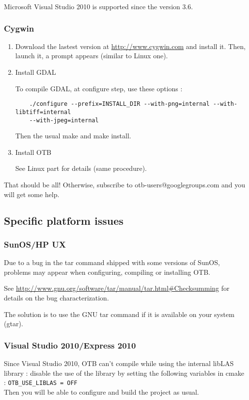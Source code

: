 Microsoft Visual Studio 2010 is supported since the version 3.6. 

\subsubsection{Cygwin}
\begin{enumerate}

\item Download the lastest version at \url{http://www.cygwin.com} and install it.
	Then, launch it, a prompt appears (similar to Linux one).

\item Install GDAL

	To compile GDAL, at configure step, use these options :
\begin{verbatim}
	./configure --prefix=INSTALL_DIR --with-png=internal --with-libtiff=internal
	--with-jpeg=internal
\end{verbatim}
	Then the usual make and make install.


\item Install OTB

	See Linux part for details (same procedure).
\end{enumerate}

That should be all! Otherwise, subscribe to
   otb-users@googlegroups.com and you will get some help.

\subsection{Specific platform issues}
\subsubsection{SunOS/HP UX}
Due to a bug in the tar command shipped with some versions of SunOS,
problems may appear when configuring, compiling or installing OTB.

See \url{http://www.gnu.org/software/tar/manual/tar.html#Checksumming} for
details on the bug characterization.

The solution is to use the GNU tar command if it is available on your
system (gtar).

\subsubsection{Visual Studio 2010/Express 2010}
Since Visual Studio 2010, OTB can't compile while using the internal libLAS library : disable the use of the library by setting 
the following variables in cmake :  \texttt{OTB\_USE\_LIBLAS = OFF}\\
Then you will be able to configure and build the project as usual.

